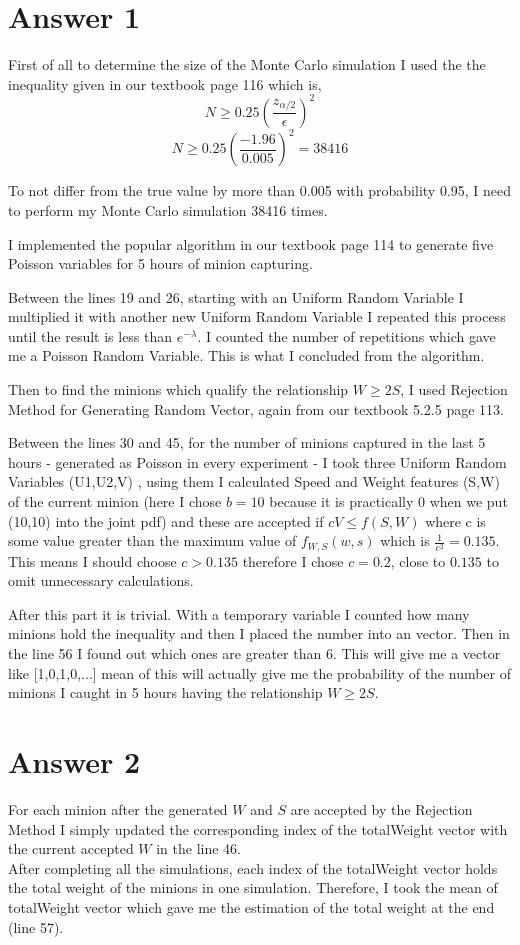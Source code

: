 \documentclass[12pt]{article}
\begin{document}
\section*{Answer 1}
First of all to determine the size of the Monte Carlo simulation I used the the inequality given in our textbook page 116 which is,
$$N\geq0.25(\frac{z_{\alpha/2}}{\epsilon})^2$$ 
$$N\geq0.25(\frac{-1.96}{0.005})^2=38416$$ \par
To not differ from the true value by more than 0.005 with probability 0.95, I need to perform my Monte Carlo simulation 38416 times. \par
I implemented the popular algorithm in our textbook page 114 to generate five Poisson variables for 5 hours of minion capturing.\par
Between the lines 19 and 26, starting with an Uniform Random Variable I multiplied it with another new Uniform Random Variable I repeated this process until the result is less than $e^{-\lambda}$. I counted the number of repetitions which gave me a Poisson Random Variable. This is what I concluded from the algorithm. \par
Then to find the minions which qualify the relationship $W\geq2S$, I used Rejection Method for Generating Random Vector, again from our textbook 5.2.5 page 113. \par
Between the lines 30 and 45, for the number of minions captured in the last 5 hours - generated as Poisson in every experiment - I took three Uniform Random Variables (U1,U2,V) , using them I calculated Speed and Weight features (S,W) of the current minion (here I chose $b=10$ because it is practically 0 when we put (10,10) into the joint pdf) and these are accepted if $cV \leq f(S,W) $ where c is some value greater than the maximum value of $f_{W,S}(w,s)$ which is $\frac{1}{e^2}=0.135$. \\
This means I should choose $c>0.135$ therefore I chose $c=0.2$, close to $0.135$ to omit unnecessary calculations. \par
After this part it is trivial. With a temporary variable I counted how many minions hold the inequality and then I placed the number into an vector. Then in the line 56 I found out which ones are greater than 6. This will give me a vector like [1,0,1,0,...]  mean of this will actually give me the probability of the number of minions I caught in 5 hours having the relationship $W\geq2S$.

\section*{Answer 2}
For each minion after the generated $W$ and $S$ are accepted by the Rejection Method I simply updated the corresponding index of the totalWeight vector with the current accepted $W$ in the line 46. \\
After completing all the simulations, each index of the totalWeight vector holds the total weight of the minions in one simulation. Therefore, I took the mean of totalWeight vector which gave me the estimation of the total weight at the end (line 57).
\end{document}
